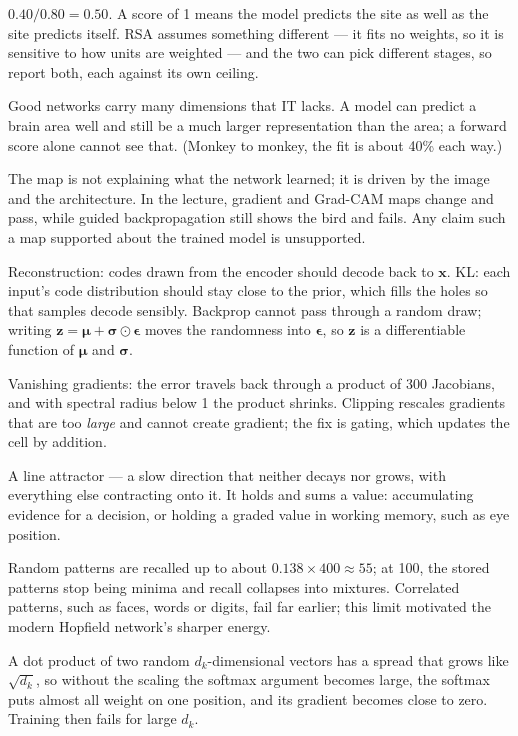 \documentclass[11pt]{article}
\begin{document}
 $0.40/0.80=0.50$. A score of 1 means the model predicts the site as well
as the site predicts itself. RSA assumes something different --- it fits no
weights, so it is sensitive to how units are weighted --- and the two can pick
different stages, so report both, each against its own ceiling.

 Good networks carry many dimensions that IT lacks. A model can predict a
brain area well and still be a much larger representation than the area; a
forward score alone cannot see that. (Monkey to monkey, the fit is about 40\%
each way.)

 The map is not explaining what the network learned; it is driven by the
image and the architecture. In the lecture, gradient and Grad-CAM maps change and
pass, while guided backpropagation still shows the bird and fails. Any claim such
a map supported about the trained model is unsupported.

 Reconstruction: codes drawn from the encoder should decode back to
$\mathbf{x}$. KL: each input's code distribution should stay close to the prior,
which fills the holes so that samples decode sensibly. Backprop cannot pass
through a random draw; writing
$\mathbf{z}=\boldsymbol{\mu}+\boldsymbol{\sigma}\odot\boldsymbol{\epsilon}$ moves
the randomness into $\boldsymbol{\epsilon}$, so $\mathbf{z}$ is a differentiable
function of $\boldsymbol{\mu}$ and $\boldsymbol{\sigma}$.

 Vanishing gradients: the error travels back through a product of 300
Jacobians, and with spectral radius below 1 the product shrinks. Clipping rescales
gradients that are too \emph{large} and cannot create gradient; the fix is gating,
which updates the cell by addition.

 A line attractor --- a slow direction that neither decays nor grows, with
everything else contracting onto it. It holds and sums a value: accumulating
evidence for a decision, or holding a graded value in working memory, such as eye
position.

 Random patterns are recalled up to about $0.138\times400\approx55$; at
100, the stored patterns stop being minima and recall collapses into mixtures.
Correlated patterns, such as faces, words or digits, fail far earlier; this
limit motivated the modern Hopfield network's sharper energy.

 A dot product of two random $d_k$-dimensional vectors has a spread that
grows like $\sqrt{d_k}$, so without the scaling the softmax argument becomes
large, the softmax puts almost all weight on one position, and its gradient
becomes close to zero. Training then fails for large $d_k$.
\end{document}

